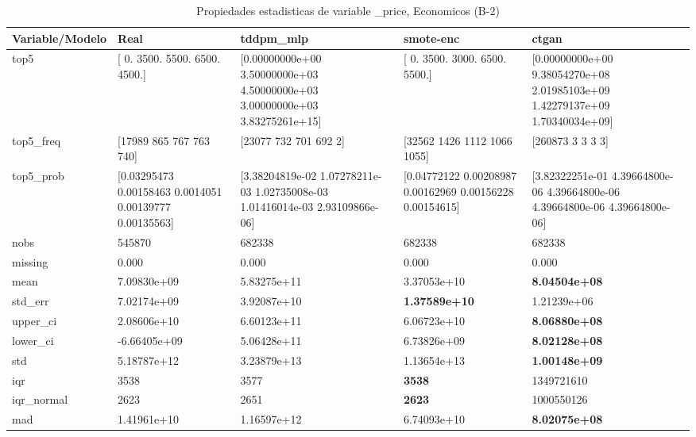 \begin{table}[H]
\centering
\fontsize{8}{14}\selectfont
\caption{Propiedades  estadisticas de variable \_price, Economicos (B-2)}
\label{table-stats-economicos-b-2-_price}
\begin{tabular}{|l|m{10em}|m{10em}|m{10em}|m{10em}|}
\hline
 \rowcolor[gray]{0.8}
Variable/Modelo & Real & tddpm\_mlp & smote-enc & ctgan \\
\hline top5 & [   0. 3500. 5500. 6500. 4500.] & [0.00000000e+00 3.50000000e+03 4.50000000e+03 3.00000000e+03
 3.83275261e+15] & [   0. 3500. 3000. 6500. 5500.] & [0.00000000e+00 9.38054270e+08 2.01985103e+09 1.42279137e+09
 1.70340034e+09] \\
\hline top5\_freq & [17989   865   767   763   740] & [23077   732   701   692     2] & [32562  1426  1112  1066  1055] & [260873      3      3      3      3] \\
\hline top5\_prob & [0.03295473 0.00158463 0.0014051  0.00139777 0.00135563] & [3.38204819e-02 1.07278211e-03 1.02735008e-03 1.01416014e-03
 2.93109866e-06] & [0.04772122 0.00208987 0.00162969 0.00156228 0.00154615] & [3.82322251e-01 4.39664800e-06 4.39664800e-06 4.39664800e-06
 4.39664800e-06] \\
\hline nobs & 545870 & 682338 & 682338 & 682338 \\
\hline missing & 0.000 & 0.000 & 0.000 & 0.000 \\
\hline mean & 7.09830e+09 & \cellcolor[rgb]{0.9, 0.54, 0.52} 5.83275e+11 & 3.37053e+10 & \bfseries 8.04504e+08 \\
\hline std\_err & 7.02174e+09 & \cellcolor[rgb]{0.9, 0.54, 0.52} 3.92087e+10 & \bfseries 1.37589e+10 & 1.21239e+06 \\
\hline upper\_ci & 2.08606e+10 & \cellcolor[rgb]{0.9, 0.54, 0.52} 6.60123e+11 & 6.06723e+10 & \bfseries 8.06880e+08 \\
\hline lower\_ci & -6.66405e+09 & \cellcolor[rgb]{0.9, 0.54, 0.52} 5.06428e+11 & 6.73826e+09 & \bfseries 8.02128e+08 \\
\hline std & 5.18787e+12 & \cellcolor[rgb]{0.9, 0.54, 0.52} 3.23879e+13 & 1.13654e+13 & \bfseries 1.00148e+09 \\
\hline iqr & 3538 & 3577 & \bfseries 3538 & \cellcolor[rgb]{0.9, 0.54, 0.52} 1349721610 \\
\hline iqr\_normal & 2623 & 2651 & \bfseries 2623 & \cellcolor[rgb]{0.9, 0.54, 0.52} 1000550126 \\
\hline mad & 1.41961e+10 & \cellcolor[rgb]{0.9, 0.54, 0.52} 1.16597e+12 & 6.74093e+10 & \bfseries 8.02075e+08 \\

\end{tabular}
\end{table}
